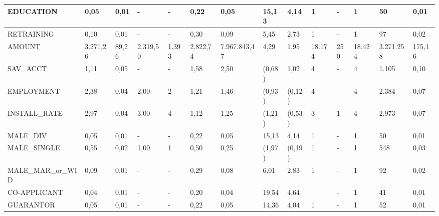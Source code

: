\begin{table}[]
\begin{tabular}{|p{2.6cm}|p{0.75cm}|p{0.6cm}|p{0.75cm}|p{0.6cm}|p{0.75cm}|p{1.2cm}|p{0.6cm}|p{0.65cm}|p{0.7cm}|p{0.45cm}|p{0.65cm}|p{0.85cm}|p{0.55cm}|}
		{\tiny EDUCATION}
		&{\tiny 0,05}&{\tiny 0,01}&{\tiny -}&{\tiny -}
		&{\tiny 0,22}&{\tiny 0,05}&{\tiny 15,13}&{\tiny 4,14}
		&{\tiny 1}&{\tiny -}&{\tiny 1}&{\tiny 50}&{\tiny 0,01}\\ \hline
		{\tiny RETRAINING}
		&{\tiny 0,10}&{\tiny 0,01}&{\tiny -}&{\tiny -}
		&{\tiny 0,30}&{\tiny 0,09}&{\tiny 5,45}&{\tiny 2,73}
		&{\tiny 1}&{\tiny -}&{\tiny 1}&{\tiny 97}&{\tiny 0,02}\\ \hline
		{\tiny AMOUNT}
		&{\tiny  3.271,26}&{\tiny 89,26}&{\tiny 2.319,50}&{\tiny 1.393}
		&{\tiny 2.822,74}&{\tiny 7.967.843,47}&{\tiny 4,29}&{\tiny 1,95}
		&{\tiny 18.174}&{\tiny 250}&{\tiny 18.424}&{\tiny 3.271.258}&{\tiny 175,16}\\ \hline
		{\tiny SAV\_ACCT}
		&{\tiny 1,11}&{\tiny 0,05}&{\tiny -}&{\tiny -}
		&{\tiny 1,58}&{\tiny 2,50}&{\tiny (0,68)}&{\tiny 1,02}
		&{\tiny 4}&{\tiny -}&{\tiny 4}&{\tiny 1.105}&{\tiny 0,10}\\ \hline
		{\tiny EMPLOYMENT}
		&{\tiny 2,38}&{\tiny 0,04}&{\tiny 2,00}&{\tiny 2}
		&{\tiny 1,21}&{\tiny 1,46}&{\tiny (0,93)}&{\tiny (0,12)}
		&{\tiny 4}&{\tiny -}&{\tiny 4}&{\tiny 2.384}&{\tiny 0,07 }\\ \hline
		{\tiny INSTALL\_RATE}
		&{\tiny 2,97}&{\tiny 0,04}&{\tiny 3,00}&{\tiny 4}
		&{\tiny 1,12}&{\tiny 1,25}&{\tiny (1,21)}&{\tiny (0,53)}
		&{\tiny 3}&{\tiny 1}&{\tiny 4}&{\tiny 2.973}&{\tiny 0,07}\\ \hline
		{\tiny MALE\_DIV}
		&{\tiny 0,05}&{\tiny 0,01}&{\tiny -}&{\tiny -}
		&{\tiny 0,22}&{\tiny 0,05}&{\tiny 15,13}&{\tiny 4,14}
		&{\tiny 1}&{\tiny -}&{\tiny 1}&{\tiny 50}&{\tiny 0,01}\\ \hline
		{\tiny MALE\_SINGLE}
		&{\tiny 0,55}&{\tiny 0,02}&{\tiny 1,00}&{\tiny 1}
		&{\tiny 0,50}&{\tiny 0,25}&{\tiny (1,97)}&{\tiny (0,19)}
		&{\tiny 1}&{\tiny -}&{\tiny 1}&{\tiny 548}&{\tiny 0,03}\\ \hline
	    {\tiny 	MALE\_MAR\_or\_WID}
	    &{\tiny 0,09}&{\tiny 0,01}&{\tiny -}&{\tiny -}
	    &{\tiny 0,29}&{\tiny 0,08}&{\tiny 6,01}&{\tiny 2,83}
	    &{\tiny 1}&{\tiny -}&{\tiny 1}&{\tiny 92}&{\tiny 0,02}\\ \hline
		{\tiny CO-APPLICANT}
		&{\tiny 0,04}&{\tiny 0,01}&{\tiny -}&{\tiny -}
		&{\tiny 0,20}&{\tiny 0,04}&{\tiny 19,54}&{\tiny 4,64}
		&{\tiny }&{\tiny -}&{\tiny 1}&{\tiny 41}&{\tiny 0,01}\\ \hline
		{\tiny GUARANTOR}
		&{\tiny 0,05}&{\tiny 0,01}&{\tiny -}&{\tiny -}
		&{\tiny 0,22}&{\tiny 0,05}&{\tiny 14,36}&{\tiny 4,04}
	    &{\tiny 1}&{\tiny -}&{\tiny 1}&{\tiny 52}&{\tiny 0,01}\\ \hline

\end{tabular}
\end{table}
